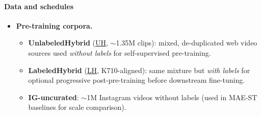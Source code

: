 \begin{enrichment}
\begin{enrichment}
            \paragraph{Data and schedules}
            \begin{itemize}
                \item \textbf{Pre-training corpora.}
                \begin{itemize}
                    \item \textbf{UnlabeledHybrid} (\underline{UH}, $\sim$1.35M clips): mixed, de-duplicated web video sources used \emph{without labels} for self-supervised pre-training.
                    \item \textbf{LabeledHybrid} (\underline{LH}, K710-aligned): same mixture but \emph{with labels} for optional progressive post-pre-training before downstream fine-tuning.
                    \item \textbf{IG-uncurated}: $\sim$1M Instagram videos without labels (used in MAE-ST baselines for scale comparison).
                \end{itemize}
                

\end{itemize}
\end{enrichment}
\end{enrichment}
